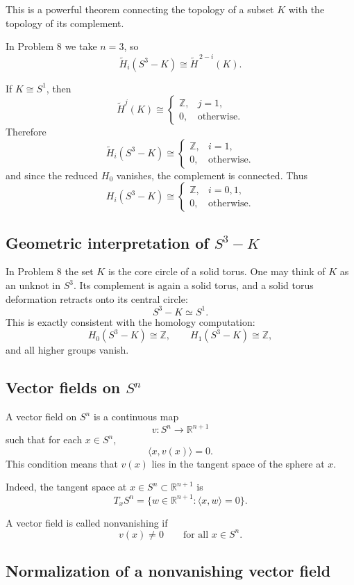 \documentclass[12pt,a4paper]{article}
\theoremstyle{notespace}
\begin{document}
This is a powerful theorem connecting the topology of a subset \(K\) with the topology of its complement.

In Problem 8 we take \(n=3\), so
\[
\widetilde H_i(S^3-K)\cong \widetilde H^{\,2-i}(K).
\]

If \(K\cong S^1\), then
\[
\widetilde H^j(K)\cong
\begin{cases}
	\mathbb Z, & j=1,\\
	0, & \text{otherwise}.
\end{cases}
\]
Therefore
\[
\widetilde H_i(S^3-K)\cong
\begin{cases}
	\mathbb Z, & i=1,\\
	0, & \text{otherwise}.
\end{cases}
\]
and since the reduced \(H_0\) vanishes, the complement is connected. Thus
\[
H_i(S^3-K)\cong
\begin{cases}
	\mathbb Z, & i=0,1,\\
	0, & \text{otherwise}.
\end{cases}
\]

\subsection{Geometric interpretation of \(S^3-K\)}

In Problem 8 the set \(K\) is the core circle of a solid torus. One may think of \(K\) as an unknot in \(S^3\). Its complement is again a solid torus, and a solid torus deformation retracts onto its central circle:
\[
S^3-K \simeq S^1.
\]
This is exactly consistent with the homology computation:
\[
H_0(S^3-K)\cong \mathbb Z,\qquad H_1(S^3-K)\cong \mathbb Z,
\]
and all higher groups vanish.

\subsection{Vector fields on \(S^n\)}

A vector field on \(S^n\) is a continuous map
\[
v:S^n\to \mathbb R^{n+1}
\]
such that for each \(x\in S^n\),
\[
\langle x,v(x)\rangle =0.
\]
This condition means that \(v(x)\) lies in the tangent space of the sphere at \(x\).

Indeed, the tangent space at \(x\in S^n\subset \mathbb R^{n+1}\) is
\[
T_xS^n=\{w\in \mathbb R^{n+1}:\langle x,w\rangle =0\}.
\]

A vector field is called nonvanishing if
\[
v(x)\neq 0\qquad \text{for all }x\in S^n.
\]

\subsection{Normalization of a nonvanishing vector field}
\end{document}
